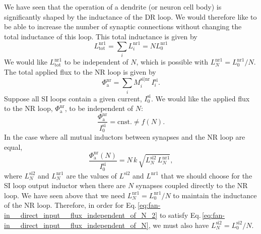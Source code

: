 \documentclass[twocolumn]{article}
\begin{document}
We have seen that the operation of a dendrite (or neuron cell body) is significantly shaped by the inductance of the DR loop. We would therefore like to be able to increase the number of synaptic connections without changing the total inductance of this loop. This total inductance is given by
\begin{equation}
\label{eq:fan-in__direct_input__si_inductance}
L^{\mathrm{nr1}}_{\mathrm{tot}} = \sum_i L^{\mathrm{nr1}}_i = N L^{\mathrm{nr1}}_0
\end{equation}
We would like $L^{\mathrm{nr1}}_{\mathrm{tot}}$ to be independent of $N$, which is possible with $L^{\mathrm{nr1}}_N = L^{\mathrm{nr1}}_0/N$. The total applied flux to the NR loop is given by
\begin{equation}
\label{eq:fan-in__direct_input__applied_flux}
\Phi_{\mathrm{a}}^{\mathrm{nr}} = \sum_i M_i^{\mathrm{si|nr}} \, I_i^{\mathrm{si}}.
\end{equation}
Suppose all SI loops contain a given current, $I_0^{\mathrm{si}}$. We would like the applied flux to the NR loop, $\Phi_{\mathrm{a}}^{\mathrm{nr}}$, to be independent of $N$:
\begin{equation}
\label{eq:fan-in__direct_input__flux_independent_of_N}
\frac{ \Phi_{\mathrm{a}}^{\mathrm{nr}} }{ I_0^{\mathrm{si}} } = \mathrm{cnst.} \neq f(N).
\end{equation}
In the case where all mutual inductors between synapses and the NR loop are equal,
\begin{equation}
\label{eq:fan-in__direct_input__flux_independent_of_N_2}
\frac{ \Phi_{\mathrm{a}}^{\mathrm{nr}}(N) }{ I_0^{\mathrm{si}} } = N\,k\,\sqrt{ L_N^{\mathrm{si2}} \, L_N^{\mathrm{nr1}}},
\end{equation}
where $L_N^{\mathrm{si2}}$ and $L_N^{\mathrm{nr1}}$ are the values of $L^{\mathrm{si2}}$ and $L^{\mathrm{nr1}}$ that we should choose for the SI loop output inductor when there are $N$ synapses coupled directly to the NR loop. We have seen above that we need $L_N^{\mathrm{nr1}} = L_0^{\mathrm{nr1}}/N$ to maintain the inductance of the NR loop. Therefore, in order for Eq.\,\ref{eq:fan-in__direct_input__flux_independent_of_N_2} to satisfy Eq.\,\ref{eq:fan-in__direct_input__flux_independent_of_N}, we must also have $L_N^{\mathrm{si2}} = L_0^{\mathrm{si2}}/N$.
\end{document}
